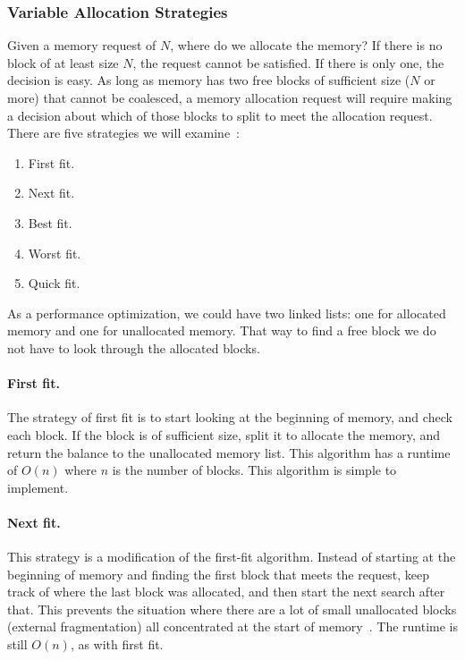 \subsubsection*{Variable Allocation Strategies}

Given a memory request of $N$, where do we allocate the memory? If there is no block of at least size $N$, the request cannot be satisfied. If there is only one, the decision is easy. As long as memory has two free blocks of sufficient size ($N$ or more) that cannot be coalesced, a memory allocation request will require making a decision about which of those blocks to split to meet the allocation request. There are five strategies we will examine~\cite{mte241}:

\begin{enumerate}
	\item First fit.
	\item Next fit.
	\item Best fit.
	\item Worst fit.
	\item Quick fit.
\end{enumerate}

As a performance optimization, we could have two linked lists: one for allocated memory and one for unallocated memory. That way to find a free block we do not have to look through the allocated blocks.

\paragraph{First fit.} The strategy of first fit is to start looking at the beginning of memory, and check each block. If the block is of sufficient size, split it to allocate the memory, and return the balance to the unallocated memory list. This algorithm has a runtime of $O(n)$ where $n$ is the number of blocks. This algorithm is simple to implement. 

\paragraph{Next fit.} This strategy is a modification of the first-fit algorithm. Instead of starting at the beginning of memory and finding the first block that meets the request, keep track of where the last block was allocated, and then start the next search after that. This prevents the situation where there are a lot of small unallocated blocks (external fragmentation) all concentrated at the start of memory~\cite{mte241}. The runtime is still $O(n)$, as with first fit.

